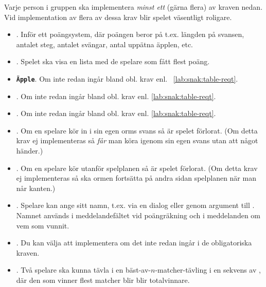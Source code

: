 Varje person i gruppen ska implementera \emph{minst ett} (gärna flera) av kraven nedan. Vid implementation av flera av dessa krav blir spelet väsentligt roligare.
\begin{itemize}[nosep, label={$\square$}]

\item \textbf{}. Inför ett poängsystem, där poängen beror på t.ex. längden på svansen, antalet steg, antalet svängar, antal uppätna äpplen, etc.

\item \textbf{}. Spelet ska visa en lista med de spelare som fått flest poäng.

\item \texttt{\textbf{Äpple}}. Om inte redan ingår bland obl. krav enl.~ \ref{lab:snak:table-reqt}.

\item \textbf{}. Om inte redan ingår bland obl. krav enl. 
\ref{lab:snak:table-reqt}.

\item \textbf{}. Om inte redan ingår bland obl. krav enl. 
\ref{lab:snak:table-reqt}.

\item \textbf{}. Om en spelare kör in i sin egen orms svans så är spelet förlorat. (Om detta krav ej implementeras så \emph{får} man köra igenom sin egen svans utan att något händer.)

\item \textbf{}. Om en spelare kör utanför spelplanen så är spelet förlorat. (Om detta krav ej implementeras så ska ormen fortsätta på andra sidan spelplanen när man når kanten.)

\item \textbf{}. Spelare kan ange sitt namn, t.ex. via en dialog eller genom argument till . Namnet används i meddelandefältet vid poängräkning och i meddelanden om vem som vunnit.

\item \textbf{}. Du kan välja att implementera  om det inte redan ingår i de obligatoriska kraven.

\item \textbf{}. Två spelare ska kunna tävla i en bäst-av-$n$-matcher-tävling i en sekvens av , där den som vinner flest matcher blir blir totalvinnare.


\end{itemize}
